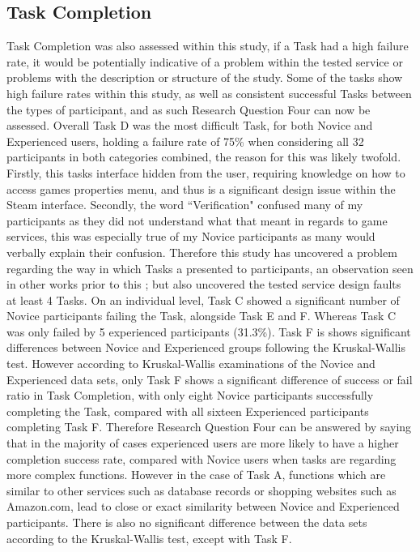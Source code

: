 \subsection{Task Completion}
Task Completion was also assessed within this study, if a Task had a high failure rate, it would be potentially indicative of a problem within the tested service or problems with the description or structure of the study. Some of the tasks show high failure rates within this study, as well as consistent successful Tasks between the types of participant, and as such Research Question Four can now be assessed. Overall Task D was the most difficult Task, for both Novice and Experienced users, holding a failure rate of 75\% when considering all 32 participants in both categories combined, the reason for this was likely twofold. Firstly, this tasks interface hidden from the user, requiring knowledge on how to access games properties menu, and thus is a significant design issue within the Steam interface. Secondly, the word ``Verification" confused many of my participants as they did not understand what that meant in regards to game services, this was especially true of my Novice participants as many would verbally explain their confusion. Therefore this study has uncovered a problem regarding the way in which Tasks a presented to participants, an observation seen in other works prior to this \citep{gerardo2007effectiveness}; but also uncovered the tested service design faults at least 4 Tasks. On an individual level, Task C showed a significant number of Novice participants failing the Task, alongside Task E and F. Whereas Task C was only failed by 5 experienced participants (31.3\%). Task F is shows significant differences between Novice and Experienced groups following the Kruskal-Wallis test. However according to Kruskal-Wallis examinations of the Novice and Experienced data sets, only Task F shows a significant difference of success or fail ratio in Task Completion, with only eight Novice participants successfully completing the Task, compared with all sixteen Experienced participants completing Task F. Therefore Research Question Four can be answered by saying that in the majority of cases experienced users are more likely to have a higher completion success rate, compared with Novice users when tasks are regarding more complex functions. However in the case of Task A, functions which are similar to other services such as database records or shopping websites such as Amazon.com, lead to close or exact similarity between Novice and Experienced participants. There is also no significant difference between the data sets according to the Kruskal-Wallis test, except with Task F.

